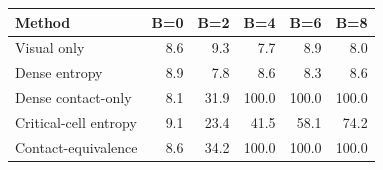 \begin{tabular}{lrrrrr}
\toprule
Method & B=0 & B=2 & B=4 & B=6 & B=8 \\
\midrule
Visual only & 8.6 & 9.3 & 7.7 & 8.9 & 8.0 \\
Dense entropy & 8.9 & 7.8 & 8.6 & 8.3 & 8.6 \\
Dense contact-only & 8.1 & 31.9 & 100.0 & 100.0 & 100.0 \\
Critical-cell entropy & 9.1 & 23.4 & 41.5 & 58.1 & 74.2 \\
Contact-equivalence & 8.6 & 34.2 & 100.0 & 100.0 & 100.0 \\
\bottomrule
\end{tabular}
